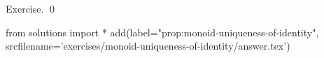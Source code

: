 
\begin{prop}
  \label{prop:monoid-uniqueness-of-identity}
  
\end{prop}
\proof
Exercise.
\qed
\begin{python0}
from solutions import *
add(label="prop:monoid-uniqueness-of-identity",
    srcfilename='exercises/monoid-uniqueness-of-identity/answer.tex') 
\end{python0}

